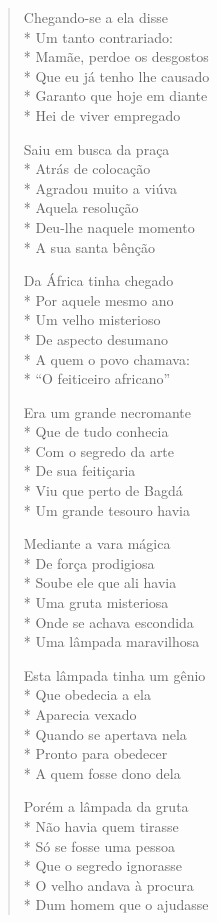 \begin{verse}
Chegando-se a ela disse\\*
Um tanto contrariado:\\*
Mamãe, perdoe os desgostos\\*
Que eu já tenho lhe causado\\*
Garanto que hoje em diante\\*
Hei de viver empregado

Saiu em busca da praça\\*
Atrás de colocação\\*
Agradou muito a viúva\\*
Aquela resolução\\*
Deu-lhe naquele momento\\*
A sua santa bênção

Da África tinha chegado\\*
Por aquele mesmo ano\\*
Um velho misterioso\\*
De aspecto desumano\\*
A quem o povo chamava:\\*
“O feiticeiro africano”

Era um grande necromante\\*
Que de tudo conhecia\\*
Com o segredo da arte\\*
De sua feitiçaria\\*
Viu que perto de Bagdá\\*
Um grande tesouro havia

Mediante a vara mágica\\*
De força prodigiosa\\*
Soube ele que ali havia\\*
Uma gruta misteriosa\\*
Onde se achava escondida\\*
Uma lâmpada maravilhosa

Esta lâmpada tinha um gênio \\*
Que obedecia a ela\\*
Aparecia vexado\\*
Quando se apertava nela\\*
Pronto para obedecer\\*
A quem fosse dono dela

Porém a lâmpada da gruta\\*
Não havia quem tirasse\\*
Só se fosse uma pessoa\\*
Que o segredo ignorasse\\*
O velho andava à procura\\*
Dum homem que o ajudasse


\end{verse}
